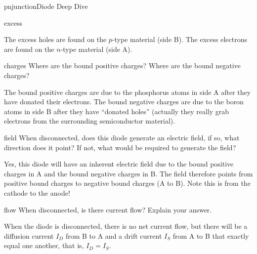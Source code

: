 \begin{mainquestion}{pnjunction}{Diode Deep Dive}
\begin{partquestion}{excess}
\begin{answer}
The excess holes are found on the $p$-type material (side B). The excess electrons are found on the $n$-type material (side A).
\end{answer}
\end{partquestion}

\begin{partquestion}{charges}
{Where are the bound positive charges? Where are the bound negative charges?}

\begin{answer}
The bound positive charges are due to the phosphorus atoms in side A after they have donated their electrons. The bound negative charges are due to the boron atoms in side B after they have “donated holes” (actually they really grab electrons from the surrounding semiconductor material).
\end{answer}
\end{partquestion}

\begin{partquestion}{field}
{When disconnected, does this diode generate an electric field, if so, what direction does it point? If not, what would be required to generate the field?}

\begin{answer}
Yes, this diode will have an inherent electric field due to the bound positive charges in A and the bound negative charges in B. The field therefore points from positive bound charges to negative bound charges (A to B). Note this is from the cathode to the anode!
\end{answer}
\end{partquestion}

\begin{partquestion}{flow}
{When disconnected, is there current flow? Explain your answer.}

\begin{answer}
When the diode is disconnected, there is no net current flow, but there will be a diffusion current $I_D$ from B to A and a drift current $I_S$ from A to B that exactly equal one another,
that is, $I_D = I_S$. 
\end{answer}
\end{partquestion}

\end{mainquestion}